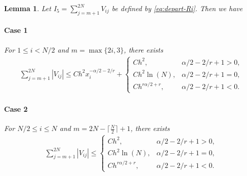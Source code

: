 \documentclass{amsart}
\newtheorem{lemma}[theorem]{Lemma}
\theoremstyle{definition}
\theoremstyle{remark}
\numberwithin{equation}{section}
\begin{document}
\begin{lemma} \label{lmm:Ri-I5-1}
Let \(I_5 = \sum_{j=m+1}^{2N} V_{ij}\) be defined by \eqref{eq:depart-Ri}. Then we have
\paragraph{Case 1}
For  \(1 \le i < N/2\) and \(m=\max\{2i, 3\}\), there exists
\begin{equation*}
  \begin{aligned}
    \sum_{j=m+1}^{2N} \left| V_{ij} \right| 
    \le C h^2 x_i^{-\alpha/2-2/r}
    + \begin{cases}
          C h^2,             & \alpha/2-2/r+1 > 0, \\
          C h^2 \ln(N) ,     & \alpha/2-2/r+1 = 0, \\
          C h^{r\alpha/2+r}, & \alpha/2-2/r+1 < 0.
        \end{cases}
  \end{aligned}
\end{equation*}
\paragraph{Case 2}
For \(N/2 \le i \le N\) and $m=2N-\lceil \frac{N}{2} \rceil +1$, there exists
\begin{equation*}
  \begin{aligned}
    \sum_{j=m+1}^{2N} |V_{ij}|
    \le \begin{cases}
          C h^2,             & \alpha/2-2/r+1 > 0, \\
          C h^2 \ln(N) ,     & \alpha/2-2/r+1 = 0, \\
          C h^{r\alpha/2+r}, & \alpha/2-2/r+1 < 0.
        \end{cases}
  \end{aligned}
\end{equation*}
\end{lemma}
\end{document}
